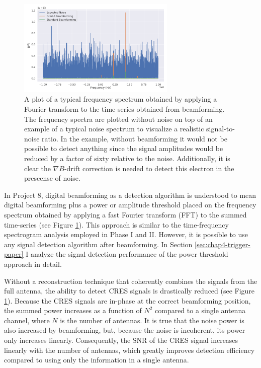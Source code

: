 \begin{figure}[htbp]
    \centering
    \includegraphics[width=0.67\textwidth]{figs/Chapter-4/220304_example_power_spectrum_gradb_vs_noise_vs_standard_bf.png}
    \caption{A plot of a typical frequency spectrum obtained by applying a Fourier transform to the time-series obtained from beamforming. The frequency spectra are plotted without noise on top of an example of a typical noise spectrum to visualize a realistic signal-to-noise ratio. In the example, without beamforming it would not be possible to detect anything since the signal amplitudes would be reduced by a factor of sixty relative to the noise. Additionally, it is clear the $\nabla B$-drift correction is needed to detect this electron in the prescense of noise.}
    \label{fig:chap4-bf-signal-example}
\end{figure}

In Project 8, digital beamforming as a detection algorithm is understood to mean digital beamforming plus a power or amplitude threshold placed on the frequency spectrum obtained by applying a fast Fourier transform (FFT) to the summed time-series (see Figure \ref{fig:chap4-bf-signal-example}). This approach is similar to the time-frequency spectrogram analysis employed in Phase I and II. However, it is possible to use any signal detection algorithm after beamforming. In Section \ref{sec:chap4-trigger-paper} I analyze the signal detection performance of the power threshold approach in detail.

Without a reconstruction technique that coherently combines the signals from the full antenna, the ability to detect CRES signals is drastically reduced (see Figure \ref{fig:chap4-bf-signal-example}). Because the CRES signals are in-phase at the correct beamforming position, the summed power increases as a function of $N^2$ compared to a single antenna channel, where $N$ is the number of antennas. It is true that the noise power is also increased by beamforming, but, because the noise is incoherent, its power only increases linearly. Consequently, the SNR of the CRES signal increases linearly with the number of antennas, which greatly improves detection efficiency compared to using only the information in a single antenna.

